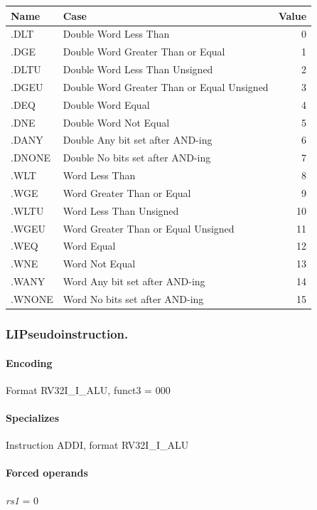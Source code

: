 {\noindent \begin{tabular}{|l|l|r|} \hline
\bf{Name} & \bf{Case} & \bf{Value} \\ \hline
.DLT & Double Word Less Than & 0 \\
.DGE & Double Word Greater Than or Equal & 1 \\
.DLTU & Double Word Less Than Unsigned & 2 \\
.DGEU & Double Word Greater Than or Equal Unsigned & 3 \\
.DEQ & Double Word Equal & 4 \\
.DNE & Double Word Not Equal & 5 \\
.DANY & Double Any bit set after AND-ing & 6 \\
.DNONE & Double No bits set after AND-ing & 7 \\
.WLT & Word Less Than & 8 \\
.WGE & Word Greater Than or Equal & 9 \\
.WLTU & Word Less Than Unsigned & 10 \\
.WGEU & Word Greater Than or Equal Unsigned & 11 \\
.WEQ & Word Equal & 12 \\
.WNE & Word Not Equal & 13 \\
.WANY & Word Any bit set after AND-ing & 14 \\
.WNONE & Word No bits set after AND-ing & 15 \\
\hline \end{tabular}
\newpage
\subsubsection[{\small LI: Pseudoinstruction.}]{LI\hfill Pseudoinstruction.}
\label{instr:LI}

\paragraph{Encoding} Format \textsf{RV32I\_I\_ALU, funct3 = 000}\\



\paragraph{Specializes} Instruction ADDI, format RV32I\_I\_ALU

\paragraph{Forced operands} \emph{rs1} = 0

}

